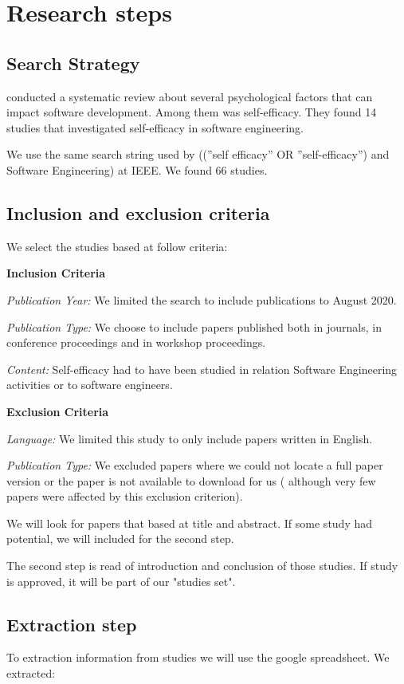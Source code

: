 \documentclass{TheMartianReport}
\begin{document}
\section{Research steps}

\subsection{Search Strategy}

\cite{lenberg2015behavioral} conducted a systematic review about several psychological factors that can impact software development. Among them was self-efficacy. They found 14 studies that investigated self-efficacy in software engineering. 

We use the same search string used by \cite{lenberg2015behavioral} ((”self efficacy” OR ”self-efficacy”) and Software Engineering) at IEEE. We found 66 studies.

\subsection{Inclusion and exclusion criteria}
We select the studies based at follow criteria:


\textbf{Inclusion Criteria}

\textit{Publication Year:} We limited the search to include publications to August 2020.

\textit{Publication Type:} We choose to include papers published both in journals, in
conference proceedings and in workshop proceedings.

\textit{Content:} Self-efficacy had to have been studied in relation Software Engineering activities or to software engineers.  


\textbf{Exclusion Criteria}

\textit{Language:} We limited this study to only include papers written in English.

\textit{Publication Type:} We excluded papers where we could not locate a full paper
version or the paper is not available to download for us ( although very few papers were affected by this exclusion criterion).


We will look for papers that based at title and abstract. If some study had potential, we will included for the second step.

The second step is  read of introduction and conclusion of those studies. If study is approved, it will be part of our "studies set".  


\subsection{Extraction step}
To extraction information from studies we will use the google spreadsheet. We extracted: 
\end{document}
